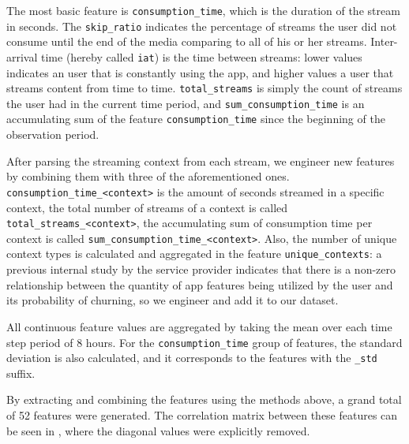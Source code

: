 \documentclass{kththesis}
\begin{document}
The most basic feature is \verb|consumption_time|, which is the duration of the stream in seconds. The \verb|skip_ratio| indicates the percentage of streams the user did not consume until the end of the media comparing to all of his or her streams. Inter-arrival time (hereby called \verb|iat|) is the time between streams: lower values indicates an user that is constantly using the app, and higher values a user that streams content from time to time. \verb|total_streams| is simply the count of streams the user had in the current time period, and \verb|sum_consumption_time| is an accumulating sum of the feature \verb|consumption_time| since the beginning of the observation period.

After parsing the streaming context from each stream, we engineer new features by combining them with three of the aforementioned ones. \verb|consumption_time_<context>| is the amount of seconds streamed in a specific context, the total number of streams of a context is called \verb|total_streams_<context>|, the accumulating sum of consumption time per context is called \verb|sum_consumption_time_<context>|.  Also, the number of unique context types is calculated and aggregated in the feature \verb|unique_contexts|: a previous internal study by the service provider indicates that there is a non-zero relationship between the quantity of app features being utilized by the user and its probability of churning, so we engineer and add it to our dataset.

All continuous feature values are aggregated by taking the mean over  each time step period of 8 hours. For the \verb|consumption_time| group of features, the standard deviation is also calculated, and it corresponds to the features with the \verb|_std| suffix.

By extracting and combining the features using the methods above, a grand total of 52 features were generated. The correlation matrix between these features can be seen in , where the diagonal values were explicitly removed.
\end{document}
